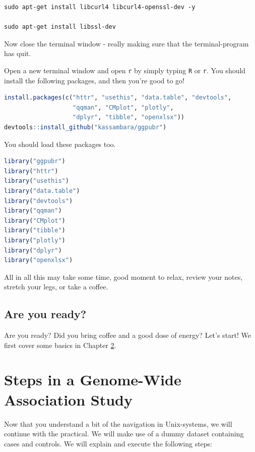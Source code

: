\documentclass[
]{book}
\newcommand{\passthrough}[1]{#1}
\begin{document}
\begin{lstlisting}
sudo apt-get install libcurl4 libcurl4-openssl-dev -y

sudo apt-get install libssl-dev
\end{lstlisting}

Now close the terminal window - really making sure that the terminal-program has quit.

Open a new terminal window and open \passthrough{\lstinline!r!} by simply typing \passthrough{\lstinline!R!} or \passthrough{\lstinline!r!}. You should install the following packages, and then you're good to go!

\begin{lstlisting}[language=R]
install.packages(c("httr", "usethis", "data.table", "devtools", 
                   "qqman", "CMplot", "plotly", 
                   "dplyr", "tibble", "openxlsx"))
devtools::install_github("kassambara/ggpubr")
\end{lstlisting}

You should load these packages too.

\begin{lstlisting}[language=R]
library("ggpubr")
library("httr")
library("usethis")
library("data.table")
library("devtools")
library("qqman")
library("CMplot")
library("tibble")
library("plotly")
library("dplyr")
library("openxlsx")
\end{lstlisting}

All in all this may take some time, good moment to relax, review your notes, stretch your legs, or take a coffee.

\hypertarget{are-you-ready}{%
\section{Are you ready?}\label{are-you-ready}}

Are you ready? Did you bring coffee and a good dose of energy? Let's start! We first cover some basics in Chapter \ref{gwas-basics}.

\hypertarget{gwas-basics}{%
\chapter{Steps in a Genome-Wide Association Study}\label{gwas-basics}}

Now that you understand a bit of the navigation in Unix-systems, we will continue with the practical. We will make use of a dummy dataset containing cases and controls. We will explain and execute the following steps:
\end{document}
